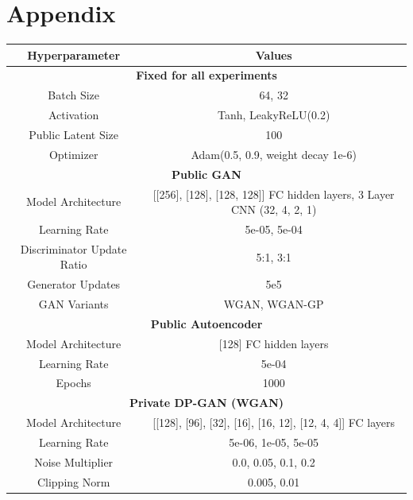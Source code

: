 \documentclass{article}
\begin{document}
\newpage




\section{Appendix}

\begin{table}[!h]
    \centering
    \begin{tabular}[!h]{|c|c|}
        \hline
        \textbf{Hyperparameter} & \textbf{Values}\\
        \hline
        \hline
        \multicolumn{2}{|c|}{\textbf{Fixed for all experiments}}\\
        \hline
        Batch Size & 64, 32\\
        Activation & Tanh, LeakyReLU(0.2)\\
        Public Latent Size & 100\\
        Optimizer & Adam(0.5, 0.9, weight decay 1e-6)\\
        \hline
        \hline
        \multicolumn{2}{|c|}{\textbf{Public GAN}}\\
        \hline
        Model Architecture & [[256], [128], [128, 128]] FC hidden layers, 3 Layer CNN (32, 4, 2, 1)\\
        Learning Rate & 5e-05, 5e-04\\
        Discriminator Update Ratio & 5:1, 3:1\\
        Generator Updates & 5e5\\
        GAN Variants & WGAN, WGAN-GP\\
        \hline
        \hline
        \multicolumn{2}{|c|}{\textbf{Public Autoencoder}}\\
        \hline
        Model Architecture & [128] FC hidden layers\\
        Learning Rate & 5e-04\\
        Epochs & 1000\\
        \hline
        \hline
        \multicolumn{2}{|c|}{\textbf{Private DP-GAN (WGAN)}}\\
        \hline
        Model Architecture & [[128], [96], [32], [16], [16, 12], [12, 4, 4]] FC layers\\
        Learning Rate & 5e-06, 1e-05, 5e-05\\
        Noise Multiplier & 0.0, 0.05, 0.1, 0.2\\
        Clipping Norm & 0.005, 0.01\\

\end{tabular}
\end{table}
\end{document}
